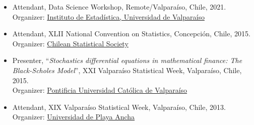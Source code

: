 \documentclass[10pt,a4paper]{article}
\begin{document}
\begin{itemize}
\item Attendant, Data Science Workshop, Remote/Valparaíso, Chile, 2021.\\
Organizer: \href{https://ideuv.uv.cl/}{Instituto de Estadística, Universidad de Valparaíso}

\item Attendant, XLII National Convention on Statistics, Concepción, Chile, 2015. \\
Organizer:  \href{http://www.soche.cl}{ Chilean Statistical
Society}
\item Presenter, ``\textit{Stochastics differential equations in mathematical finance: The Black-Scholes Model}'', XXI Valparaíso Statistical Week, Valparaíso, Chile, 2015. \\ Organizer: \href{http://www.pucv.cl}{Pontificia Universidad Católica de Valparaíso}

\item Attendant, XIX Valparaíso Statistical Week, Valparaíso, Chile, 2013. \\ Organizer:  \href{http://www.upla.cl}{Universidad de Playa Ancha}


\end{itemize}
\end{document}
